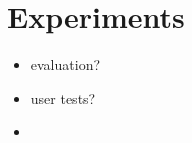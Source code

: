 \chapter{Experiments}\label{ch:experiments}

\begin{itemize}
    \item evaluation? 
    \item user tests? 
    \item 
\end{itemize}
